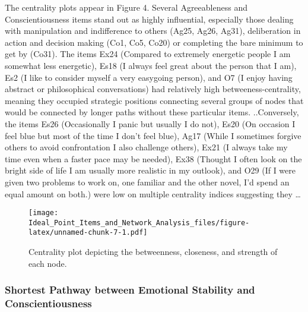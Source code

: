 \documentclass[english,man]{apa6}
\theoremstyle{definition}
\theoremstyle{definition}
\theoremstyle{remark}
\begin{document}
The centrality plots appear in Figure 4. Several Agreeableness and
Conscientiousness items stand out as highly influential, especially
those dealing with manipulation and indifference to others (Ag25, Ag26,
Ag31), deliberation in action and decision making (Co1, Co5, Co20) or
completing the bare minimum to get by (Co31). The items Ex24 (Compared
to extremely energetic people I am somewhat less energetic), Es18 (I
always feel great about the person that I am), Es2 (I like to consider
myself a very easygoing person), and O7 (I enjoy having abstract or
philosophical conversations) had relatively high betweeness-centrality,
meaning they occupied strategic positions connecting several groups of
nodes that would be connected by longer paths without these particular
items. ..Conversely, the items Es26 (Occasionally I panic but usually I
do not), Es20 (On occasion I feel blue but most of the time I don't feel
blue), Ag17 (While I sometimes forgive others to avoid confrontation I
also challenge others), Ex21 (I always take my time even when a faster
pace may be needed), Ex38 (Thought I often look on the bright side of
life I am usually more realistic in my outlook), and O29 (If I were
given two problems to work on, one familiar and the other novel, I'd
spend an equal amount on both.) were low on multiple centrality indices
suggesting they \ldots{}

\begin{figure}[htbp]
\centering
\texttt{[image: Ideal\_Point\_Items\_and\_Network\_Analysis\_files/figure-latex/unnamed-chunk-7-1.pdf]}
\caption{\label{fig:unnamed-chunk-7}Centrality plot depicting the
betweenness, closeness, and strength of each node.}
\end{figure}

\subsubsection{Shortest Pathway between Emotional Stability and
Conscientiousness}\label{shortest-pathway-between-emotional-stability-and-conscientiousness}
\end{document}
